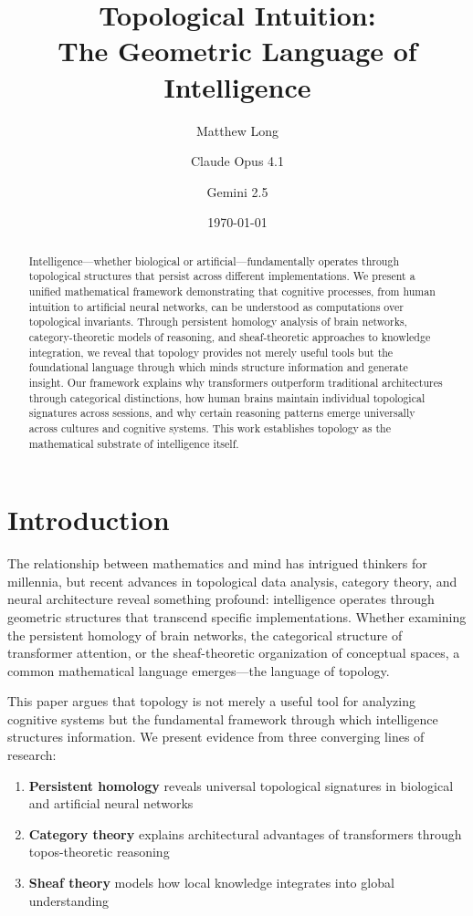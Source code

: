 \documentclass[11pt]{article}
\title{\textbf{Topological Intuition: \\
The Geometric Language of Intelligence}}
\author[1]{Matthew Long}
\author[2]{Claude Opus 4.1}
\author[3]{Gemini 2.5}
\affil[1]{YonedaAI}
\affil[2]{Anthropic}
\affil[3]{Google}
\date{\today}
\begin{document}
\maketitle

\begin{abstract}
Intelligence—whether biological or artificial—fundamentally operates through topological structures that persist across different implementations. We present a unified mathematical framework demonstrating that cognitive processes, from human intuition to artificial neural networks, can be understood as computations over topological invariants. Through persistent homology analysis of brain networks, category-theoretic models of reasoning, and sheaf-theoretic approaches to knowledge integration, we reveal that topology provides not merely useful tools but the foundational language through which minds structure information and generate insight. Our framework explains why transformers outperform traditional architectures through categorical distinctions, how human brains maintain individual topological signatures across sessions, and why certain reasoning patterns emerge universally across cultures and cognitive systems. This work establishes topology as the mathematical substrate of intelligence itself.
\end{abstract}

\tableofcontents

\section{Introduction}

The relationship between mathematics and mind has intrigued thinkers for millennia, but recent advances in topological data analysis, category theory, and neural architecture reveal something profound: intelligence operates through geometric structures that transcend specific implementations. Whether examining the persistent homology of brain networks, the categorical structure of transformer attention, or the sheaf-theoretic organization of conceptual spaces, a common mathematical language emerges—the language of topology.

This paper argues that topology is not merely a useful tool for analyzing cognitive systems but the fundamental framework through which intelligence structures information. We present evidence from three converging lines of research:

\begin{enumerate}
\item \textbf{Persistent homology} reveals universal topological signatures in biological and artificial neural networks
\item \textbf{Category theory} explains architectural advantages of transformers through topos-theoretic reasoning
\item \textbf{Sheaf theory} models how local knowledge integrates into global understanding
\end{enumerate}
\end{document}
